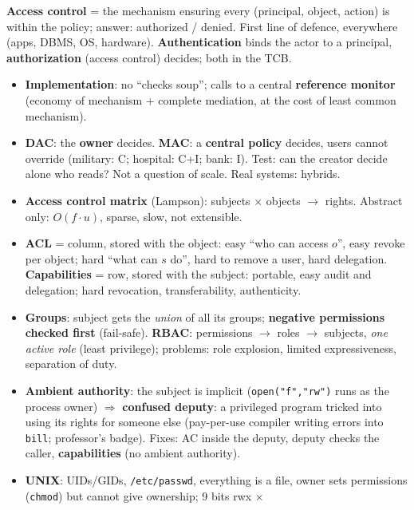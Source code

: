 \begin{recapbox}[title={Exam-ready recap --- Lecture 3: Access control basics and DAC}]
\textbf{Access control} = the mechanism ensuring every (principal, object, action) is within the
policy; answer: authorized / denied. First line of defence, everywhere (apps, DBMS, OS,
hardware). \textbf{Authentication} binds the actor to a principal, \textbf{authorization} (access
control) decides; both in the TCB.
\begin{itemize}
  \item \textbf{Implementation}: no ``checks soup''; calls to a central \textbf{reference monitor}
        (economy of mechanism + complete mediation, at the cost of least common mechanism).
  \item \textbf{DAC}: the \textbf{owner} decides. \textbf{MAC}: a \textbf{central policy}
        decides, users cannot override (military: C; hospital: C+I; bank: I). Test: can the
        creator decide alone who reads? Not a question of scale. Real systems: hybrids.
  \item \textbf{Access control matrix} (Lampson): subjects $\times$ objects $\to$ rights.
        Abstract only: $O(f \cdot u)$, sparse, slow, not extensible.
  \item \textbf{ACL} = column, stored with the object: easy ``who can access $o$'', easy revoke
        per object; hard ``what can $s$ do'', hard to remove a user, hard delegation.
        \textbf{Capabilities} = row, stored with the subject: portable, easy audit and
        delegation; hard revocation, transferability, authenticity.
  \item \textbf{Groups}: subject gets the \emph{union} of all its groups;
        \textbf{negative permissions checked first} (fail-safe). \textbf{RBAC}: permissions
        $\to$ roles $\to$ subjects, \emph{one active role} (least privilege); problems: role
        explosion, limited expressiveness, separation of duty.
  \item \textbf{Ambient authority}: the subject is implicit (\texttt{open("f","rw")} runs as the
        process owner) $\Rightarrow$ \textbf{confused deputy}: a privileged program tricked into
        using its rights for someone else (pay-per-use compiler writing errors into
        \texttt{bill}; professor's badge). Fixes: AC inside the deputy, deputy checks the
        caller, \textbf{capabilities} (no ambient authority).
  \item \textbf{UNIX}: UIDs/GIDs, \texttt{/etc/passwd}, everything is a file, owner sets
        permissions (\texttt{chmod}) but cannot give ownership; 9 bits rwx $\times$

\end{itemize}
\end{recapbox}
